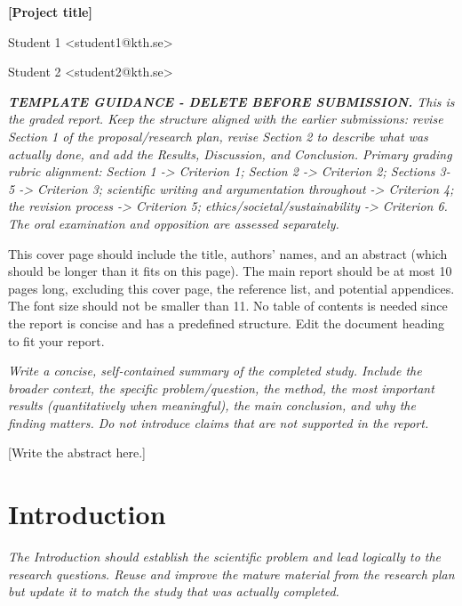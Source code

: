 \documentclass[11pt,a4paper]{article}
\newcommand{\unnumberedheading}[1]{%
  \par\vspace{2pt}{\fontsize{14}{16.5}\selectfont\bfseries #1\par}\vspace{6pt}%
}
\newcommand{\reporttitle}[1]{%
  {\fontsize{16}{19}\selectfont\bfseries #1\par}\vspace{12pt}%
}
\newcommand{\guidance}[1]{%
  {\setstretch{1.0}\fontsize{9}{11}\selectfont\color{guidancetext}\itshape #1\par}%
  \vspace{-6pt}%
}
\newenvironment{guidancebox}
  {\begin{mdframed}[backgroundcolor=guidancebg,linecolor=guidancebg,linewidth=0pt,
    innerleftmargin=3pt,innerrightmargin=3pt,innertopmargin=2pt,innerbottommargin=2pt,
    skipabove=6pt,skipbelow=10pt]
   \setstretch{1.0}\fontsize{9}{11}\selectfont\color{guidancetext}\itshape\setlength{\parskip}{6pt}}
  {\end{mdframed}}
\newcommand{\placeholder}[1]{#1\par}
\begin{document}
\reporttitle{[Project title]}
\unnumberedheading{Authors}
Student 1 <student1@kth.se>\par
Student 2 <student2@kth.se>\par
\vspace{2pt}

\begin{guidancebox}
\textbf{TEMPLATE GUIDANCE - DELETE BEFORE SUBMISSION.} This is the graded report. Keep the structure aligned with the earlier submissions: revise Section 1 of the proposal/research plan, revise Section 2 to describe what was actually done, and add the Results, Discussion, and Conclusion. Primary grading rubric alignment: Section 1 -> Criterion 1; Section 2 -> Criterion 2; Sections 3-5 -> Criterion 3; scientific writing and argumentation throughout -> Criterion 4; the revision process -> Criterion 5; ethics/societal/sustainability -> Criterion 6. The oral examination and opposition are assessed separately.\par
This cover page should include the title, authors’ names, and an abstract (which should be longer than it fits on this page). The main report should be at most 10 pages long, excluding this cover page, the reference list, and potential appendices. The font size should not be smaller than 11. No table of contents is needed since the report is concise and has a predefined structure. Edit the document heading to fit your report.\par
\end{guidancebox}

\unnumberedheading{Abstract}

\guidance{Write a concise, self-contained summary of the completed study. Include the broader context, the specific problem/question, the method, the most important results (quantitatively when meaningful), the main conclusion, and why the finding matters. Do not introduce claims that are not supported in the report.}
\placeholder{[Write the abstract here.]}

\newpage

\section{Introduction}

\guidance{The Introduction should establish the scientific problem and lead logically to the research questions. Reuse and improve the mature material from the research plan but update it to match the study that was actually completed.}
\end{document}
